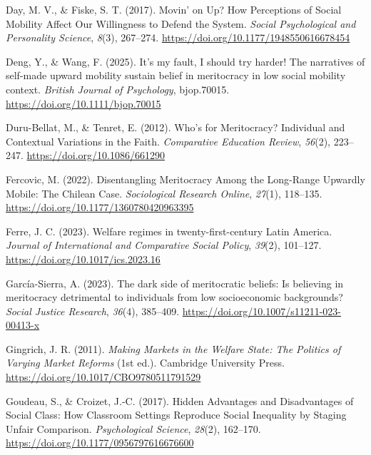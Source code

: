 \documentclass[
  13pt,
]{article}
\newlength{\cslhangindent}
\newenvironment{CSLReferences}[2] %
 {\begin{list}{}{%
  \setlength{\itemindent}{0pt}
  \setlength{\leftmargin}{0pt}
  \setlength{\parsep}{0pt}
  \ifodd #1
   \setlength{\leftmargin}{\cslhangindent}
   \setlength{\itemindent}{-1\cslhangindent}
  \fi
  \setlength{\itemsep}{#2\baselineskip}}}
 {\end{list}}
\begin{document}
\begin{CSLReferences}{1}{0}
Day, M. V., \& Fiske, S. T. (2017). Movin' on {Up}? {How Perceptions} of
{Social Mobility Affect Our Willingness} to {Defend} the {System}.
\emph{Social Psychological and Personality Science}, \emph{8}(3),
267--274. \url{https://doi.org/10.1177/1948550616678454}

Deng, Y., \& Wang, F. (2025). It's my fault, {I} should try harder!
{The} narratives of self-made upward mobility sustain belief in
meritocracy in low social mobility context. \emph{British Journal of
Psychology}, bjop.70015. \url{https://doi.org/10.1111/bjop.70015}

Duru-Bellat, M., \& Tenret, E. (2012). Who's for {Meritocracy}?
{Individual} and {Contextual Variations} in the {Faith}.
\emph{Comparative Education Review}, \emph{56}(2), 223--247.
\url{https://doi.org/10.1086/661290}

Fercovic, M. (2022). Disentangling {Meritocracy Among} the {Long-Range
Upwardly Mobile}: {The Chilean Case}. \emph{Sociological Research
Online}, \emph{27}(1), 118--135.
\url{https://doi.org/10.1177/1360780420963395}

Ferre, J. C. (2023). Welfare regimes in twenty-first-century {Latin
America}. \emph{Journal of International and Comparative Social Policy},
\emph{39}(2), 101--127. \url{https://doi.org/10.1017/ics.2023.16}

García-Sierra, A. (2023). The dark side of meritocratic beliefs: {Is}
believing in meritocracy detrimental to individuals from low
socioeconomic backgrounds? \emph{Social Justice Research}, \emph{36}(4),
385--409. \url{https://doi.org/10.1007/s11211-023-00413-x}

Gingrich, J. R. (2011). \emph{Making {Markets} in the {Welfare State}:
{The Politics} of {Varying Market Reforms}} (1st ed.). Cambridge
University Press. \url{https://doi.org/10.1017/CBO9780511791529}

Goudeau, S., \& Croizet, J.-C. (2017). Hidden {Advantages} and
{Disadvantages} of {Social Class}: {How Classroom Settings Reproduce
Social Inequality} by {Staging Unfair Comparison}. \emph{Psychological
Science}, \emph{28}(2), 162--170.
\url{https://doi.org/10.1177/0956797616676600}


\end{CSLReferences}
\end{document}
